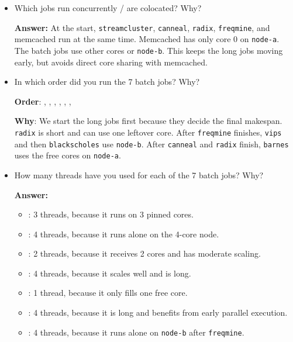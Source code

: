 \begin{enumerate}
\begin{enumerate}
\begin{itemize}
        \item Which jobs run concurrently / are colocated? Why?

        \textbf{Answer:} At the start, \texttt{streamcluster}, \texttt{canneal}, \texttt{radix}, \texttt{freqmine}, and memcached run at the same time. Memcached has only core 0 on \texttt{node-a}. The batch jobs use other cores or \texttt{node-b}. This keeps the long jobs moving early, but avoids direct core sharing with memcached.
        \\

        \item In which order did you run the 7 batch jobs? Why?

        \textbf{Order}: , , , , , , 

        \textbf{Why}: We start the long jobs first because they decide the final makespan. \texttt{radix} is short and can use one leftover core. After \texttt{freqmine} finishes, \texttt{vips} and then \texttt{blackscholes} use \texttt{node-b}. After \texttt{canneal} and \texttt{radix} finish, \texttt{barnes} uses the free cores on \texttt{node-a}.
        \\

        \item How many threads have you used for each of the 7 batch jobs? Why?

        \textbf{Answer:}

        \begin{itemize}
            \item {}: 3 threads, because it runs on 3 pinned cores.
            \item {}: 4 threads, because it runs alone on the 4-core node.
            \item {}: 2 threads, because it receives 2 cores and has moderate scaling.
            \item {}: 4 threads, because it scales well and is long.
            \item {}: 1 thread, because it only fills one free core.
            \item {}: 4 threads, because it is long and benefits from early parallel execution.
            \item {}: 4 threads, because it runs alone on \texttt{node-b} after \texttt{freqmine}.
            \\
        \end{itemize}


\end{itemize}
\end{enumerate}
\end{enumerate}
